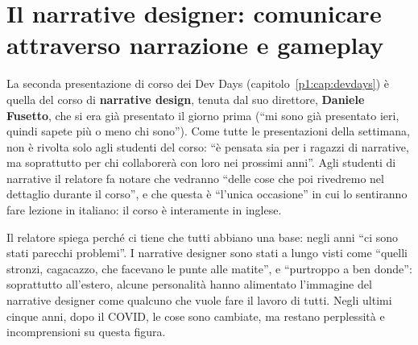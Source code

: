 %

\chapter[Il narrative designer]{Il narrative designer: comunicare
attraverso narrazione e gameplay}
\label{p3:cap:narrative}

La seconda presentazione di corso dei Dev Days (capitolo~\ref{p1:cap:devdays})
è quella del corso di \textbf{narrative design}, tenuta dal suo direttore,
\textbf{Daniele Fusetto}, che si era già presentato il giorno prima (``mi
sono già presentato ieri, quindi sapete più o meno chi sono''). Come tutte le
presentazioni della settimana, non è rivolta solo agli studenti del corso:
``è pensata sia per i ragazzi di narrative, ma soprattutto per chi
collaborerà con loro nei prossimi anni''. Agli studenti di narrative il
relatore fa notare che vedranno ``delle cose che poi rivedremo nel dettaglio
durante il corso'', e che questa è ``l'unica occasione'' in cui lo sentiranno
fare lezione in italiano: il corso è interamente in inglese.

Il relatore spiega perché ci tiene che tutti abbiano una base: negli anni
``ci sono stati parecchi problemi''. I narrative designer sono stati a lungo
visti come ``quelli stronzi, cagacazzo, che facevano le punte alle matite'',
e ``purtroppo a ben donde'': soprattutto all'estero, alcune personalità
hanno alimentato l'immagine del narrative designer come qualcuno che vuole
fare il lavoro di tutti. Negli ultimi cinque anni, dopo il COVID, le cose
sono cambiate, ma restano perplessità e incomprensioni su questa figura.

